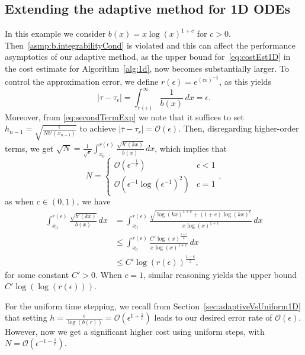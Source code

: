 \documentclass[a4paper, oneside, reqno]{amsart}
\newcommand{\abs}[1]{\left\lvert#1\right\rvert}
\theoremstyle{remark}
\begin{document}
\subsection{Extending the adaptive method for 1D ODEs}
\label{sec:numExp_xlogx_c}
In this example we consider \(b(x) = x\log(x)^{1+c}\) for \(c>0 \). Then~\ref{asmp:b.integrabilityCond} is 
violated and this can affect the performance asymptotics of our adaptive method, as 
the upper bound for~\eqref{eq:costEst1D} in the cost estimate for Algorithm~\ref{alg:1d},
now becomes substantially larger. To control the approximation error, we define \(r(\epsilon) = e^{(c\epsilon)^{-\frac{1}{c}}}\), 
as this yields  
\[
|\tau - \tau_\epsilon| = \int_{r(\epsilon)}^\infty\frac{1}{b(x)}\,dx = \epsilon.
\]
Moreover, from \eqref{eq:secondTermExp} we note that it suffices to set \(h_{n-1} = \sqrt{\frac{\epsilon}{Nb'(x_{n-1})}}\) to achieve \(\abs{\bar\tau-\tau_r} = \mathcal{O}(\epsilon)\). 
Then, disregarding higher-order terms, we get \(\sqrt{N} = \frac{1}{\sqrt{\epsilon}}\int_{x_0}^{r(\epsilon)}\frac{\sqrt{b'(kx)}}{b(x)}\,dx\), which implies that 
\[N = \begin{cases}
    \mathcal{O}\left(\epsilon^{-\frac{1}{c}}\right) & c < 1\\
    \mathcal{O}\left(\epsilon^{-1}\log(\epsilon^{-1})^2\right) & c = 1
\end{cases},\] 
as when $c \in (0,1)$, we have
\begin{align*}
    \int_{x_0}^{r(\epsilon)}\frac{\sqrt{b'(kx)}}{b(x)}\,dx &= \int_{x_0}^{r(\epsilon)}\frac{\sqrt{\log(kx)^{1+c} + (1+c)\log(kx)^c}}{x\log(x)^{1+c}}\,dx \nonumber \\
    &\leq \int_{x_0}^{r(\epsilon)}\frac{C'\log(x)^{\frac{1+c}{2}}}{x\log(x)^{1+c}}\,dx \nonumber \\ 
    & \leq C'\log(r(\epsilon))^{\frac{1-c}{2}},
\end{align*}
for some constant \(C'>0\). When \(c = 1\), similar reasoning yields the upper bound \(C'\log(\log(r(\epsilon)))\). 

For the uniform time stepping, we recall from Section~\ref{sec:adaptiveVsUniform1D} that setting \(h=\frac{\epsilon}{\log(b(r))} = \mathcal{O}\left(\epsilon^{1 + \frac{1}{c}}\right)\) leads to our desired error rate of \(\mathcal{O}(\epsilon)\). However, now we get a significant higher cost using uniform steps, with \(N = \mathcal{O}(\epsilon^{-1-\frac{1}{c}})\). 
\end{document}
